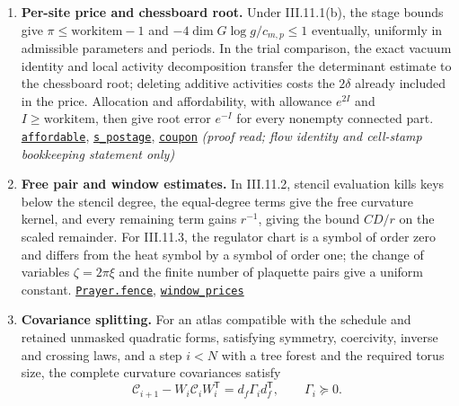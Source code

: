 \documentclass[
  letterpaper,
  11pt]{article}
\newcounter{none} %
\begin{document}
\begin{enumerate}
\item
  \textbf{Per-site price and chessboard root.} Under III.11.1(b), the
  stage bounds give \(\pi\le\mathrm{work item}-1\) and
  \(-4\dim G\log g/c_{m,p}\le1\) eventually, uniformly in admissible
  parameters and periods. In the trial comparison, the exact vacuum
  identity and local activity decomposition transfer the determinant
  estimate to the chessboard root; deleting additive activities costs
  the \(2\delta\) already included in the price. Allocation and
  affordability, with allowance \(e^{2I}\) and
  \(I\ge\mathrm{work item}\), then give root error \(e^{-I}\) for every
  nonempty connected part.
  \href{https://github.com/yang-mills-group/OpenAI-YM-20261028/blob/3456e5e75cf8d4cd558955a5c7638fba2d68f464/YM/Next/RANK/StationMeter.lean\#L119-L123}{\texttt{affordable}},
  \href{https://github.com/yang-mills-group/OpenAI-YM-20261028/blob/3456e5e75cf8d4cd558955a5c7638fba2d68f464/YM/PhysicalNext/AFTERNOON_INTERACTING_RANK_COMPARISON/Soft/Denarii.lean\#L49-L85}{\texttt{s\_postage}},
  \href{https://github.com/yang-mills-group/OpenAI-YM-20261028/blob/3456e5e75cf8d4cd558955a5c7638fba2d68f464/YM/PhysicalNext/AFTERNOON_INTERACTING_RANK_COMPARISON/Soft/Denarii.lean\#L90-L123}{\texttt{coupon}}
  \emph{(proof read; flow identity and cell-stamp bookkeeping statement
  only)}
\item
  \textbf{Free pair and window estimates.} In III.11.2, stencil
  evaluation kills keys below the stencil degree, the equal-degree terms
  give the free curvature kernel, and every remaining term gains
  \(r^{-1}\), giving the bound \(CD/r\) on the scaled remainder. For
  III.11.3, the regulator chart is a symbol of order zero and differs
  from the heat symbol by a symbol of order one; the change of variables
  \(\zeta=2\pi\xi\) and the finite number of plaquette pairs give a
  uniform constant.
  \href{https://github.com/yang-mills-group/OpenAI-YM-20261028/blob/3456e5e75cf8d4cd558955a5c7638fba2d68f464/YM/Next/RANK/StrideCost.lean\#L70-L98}{\texttt{Prayer.fence}},
  \href{https://github.com/yang-mills-group/OpenAI-YM-20261028/blob/3456e5e75cf8d4cd558955a5c7638fba2d68f464/YM/PhysicalNext/RANK_COVARIANCE_ATLAS/Window.lean\#L118-L136}{\texttt{window\_prices}}
\item
  \textbf{Covariance splitting.} For an atlas compatible with the
  schedule and retained unmasked quadratic forms, satisfying symmetry,
  coercivity, inverse and crossing laws, and a step \(i<N\) with a tree
  forest and the required torus size, the complete curvature covariances
  satisfy
  \[\mathcal C_{i+1}-W_i\mathcal C_iW_i^{\mathsf T}=d_f\Gamma_i d_f^{\mathsf T},\qquad\Gamma_i\succeq0.\]

\end{enumerate}
\end{document}
